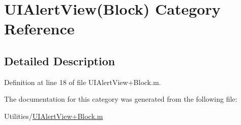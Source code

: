\hypertarget{category_u_i_alert_view_07_block_08}{\section{U\+I\+Alert\+View(Block) Category Reference}
\label{category_u_i_alert_view_07_block_08}
}


\subsection{Detailed Description}


Definition at line 18 of file U\+I\+Alert\+View+\+Block.\+m.



The documentation for this category was generated from the following file\+:\begin{DoxyCompactItemize}
\item 
Utilities/\hyperlink{_u_i_alert_view_09_block_8m}{U\+I\+Alert\+View+\+Block.\+m}\end{DoxyCompactItemize}
